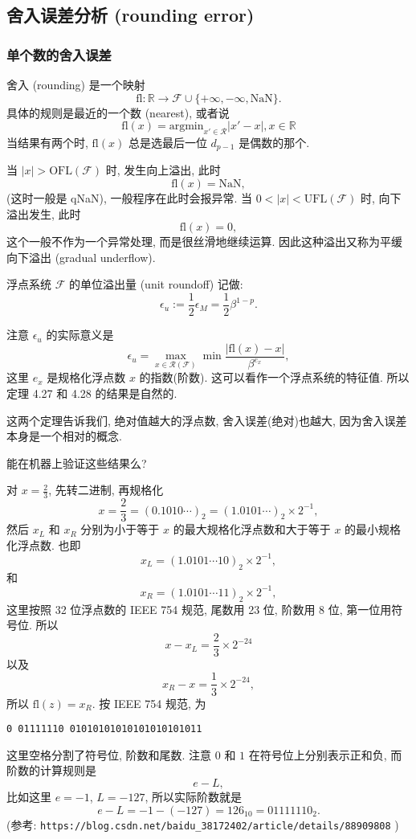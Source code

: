 \documentclass[a4paper]{ctexart}
\begin{document}
{\subsection{舍入误差分析 (rounding error)}

\subsubsection{单个数的舍入误差}
 舍入 (rounding) 是一个映射
$$
\mbox{fl} : \mathbb{R} \to \mathscr{F} \cup \{+\infty, -\infty, \mbox{NaN}\}.
$$
具体的规则是最近的一个数 (nearest), 或者说
$$
\mbox{fl}(x) = \mbox{argmin}_{x' \in \mathscr{R}} |x' - x|, x \in \mathbb{R}
$$
当结果有两个时, $\mbox{fl}(x)$ 总是选最后一位 $d_{p - 1}$ 是偶数的那个.

 当 $|x| > \mbox{OFL}(\mathscr{F})$ 时, 发生向上溢出, 此时
$$
\mbox{fl}(x) = \mbox{NaN},
$$
(这时一般是 qNaN), 一般程序在此时会报异常. 当 $0 < |x| < \mbox{UFL}(\mathscr{F})$ 时,
向下溢出发生, 此时
$$
\mbox{fl}(x) = 0,
$$
这个一般不作为一个异常处理, 而是很丝滑地继续运算. 因此这种溢出又称为平缓向下溢出
(gradual underflow).

 浮点系统 $\mathscr{F}$ 的单位溢出量 (unit roundoff) 记做:
$$
\epsilon_u := \frac{1}{2}\epsilon_M = \frac{1}{2}\beta^{1 - p}.
$$

注意 $\epsilon_u$ 的实际意义是
$$
\epsilon_u = \max_{x \in \mathscr{R}(\mathscr{F})}\min
\frac{|\mbox{fl}(x) - x|}{\beta^{e_x}},
$$
这里 $e_x$ 是规格化浮点数 $x$ 的指数(阶数). 这可以看作一个浮点系统的特征值.
所以定理 4.27 和 4.28 的结果是自然的.

这两个定理告诉我们, 绝对值越大的浮点数, 舍入误差(绝对)也越大, 
因为舍入误差本身是一个相对的概念.


 能在机器上验证这些结果么?

对 $x = \frac{2}{3}$, 先转二进制, 再规格化
$$
x = \frac{2}{3} = (0.1010\cdots)_2 = (1.0101\cdots)_2 \times 2^{-1},
$$
然后 $x_L$ 和 $x_R$ 分别为小于等于 $x$ 的最大规格化浮点数和大于等于
$x$ 的最小规格化浮点数. 也即
$$
x_L = (1.0101\cdots10)_2 \times 2^{-1},
$$
和
$$
x_R = (1.0101\cdots11)_2 \times 2^{-1},
$$
这里按照 32 位浮点数的 IEEE 754 规范, 尾数用 23 位, 阶数用 8 位, 第一位用符号位.
所以
$$
x - x_L = \frac{2}{3} \times 2^{-24}
$$
以及
$$
x_R - x = \frac{1}{3} \times 2^{-24},
$$
所以 $\mbox{fl}(z) = x_R$. 按 IEEE 754 规范, 为
\begin{verbatim}
0 01111110 01010101010101010101011
\end{verbatim}
这里空格分割了符号位, 阶数和尾数. 注意 $0$ 和 $1$ 在符号位上分别表示正和负,
而阶数的计算规则是
$$
e - L,
$$
比如这里 $e = -1$, $L = -127$, 所以实际阶数就是
$$
e - L = -1 - (-127) = 126_{10} = 01111110_2.
$$
(参考:\newline
\verb|https://blog.csdn.net/baidu_38172402/article/details/88909808|
)

}
\end{document}

